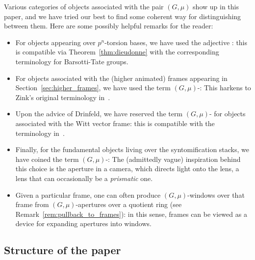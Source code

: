 \documentclass[10pt]{amsart}
\begin{document}
Various categories of objects associated with the pair $(G,\mu)$ show up in this paper, and we have tried our best to find some coherent way for distinguishing between them. Here are some possibly helpful remarks for the reader:
\begin{itemize}
   \item For objects appearing over $p^n$-torsion bases, we have used the adjective : this is compatible via Theorem~\ref{thm:dieudonne} with the corresponding terminology for Barsotti-Tate groups.
   \item For objects associated with the (higher animated) frames appearing in Section~\ref{sec:higher_frames}, we have used the term $(G,\mu)$-: This harkens to Zink's original terminology in~\cite{MR1827031}.
   \item Upon the advice of Drinfeld, we have reserved the term $(G,\mu)$- for objects associated with the Witt vector frame: this is compatible with the terminology in~\cite{MR4120808}.
   \item Finally, for the fundamental objects living over the syntomification stacks, we have coined the term $(G,\mu)$-: The (admittedly vague) inspiration behind this choice is the aperture in a camera, which directs light onto the lens, a lens that can occasionally be a \emph{prismatic} one. 
   \item Given a particular frame, one can often produce $(G,\mu)$-windows over that frame from $(G,\mu)$-apertures over a quotient ring (see Remark~\ref{rem:pullback_to_frames}): in this sense, frames can be viewed as a device for expanding apertures into windows.
\end{itemize}


\subsection{Structure of the paper}
\end{document}
